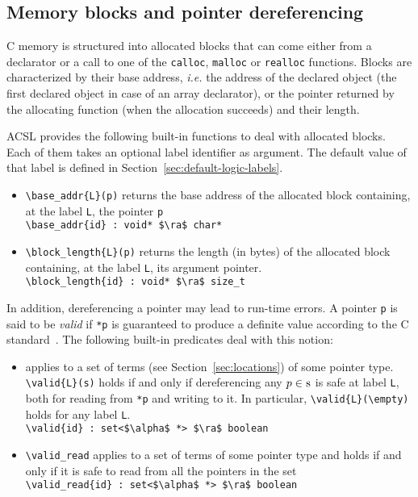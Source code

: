 \subsection{Memory blocks and pointer dereferencing}
\label{subsec:memory}
C memory is structured into allocated blocks that can come either from a 
declarator or a call to one of the \lstinline|calloc|, \lstinline|malloc| or
\lstinline|realloc| functions. Blocks are characterized by their base address, 
{\it i.e.} the address of the declared object (the first declared object 
in case of an array declarator), or the pointer returned by the allocating 
function (when the allocation succeeds) and their length.

ACSL provides the following built-in functions to deal with allocated blocks.
Each of them takes an optional label identifier as argument.
The default value of that label is defined in Section~\ref{sec:default-logic-labels}.
\begin{itemize}
\item \lstinline|\base_addr{L}(p)|
returns the base address of the allocated block
containing, at the label \lstinline|L|, the pointer \lstinline|p|
\\ \makebox[5mm]{} \lstinline|\base_addr{id} : void* $\ra$ char*|

\item \lstinline|\block_length{L}(p)|
  returns the length (in bytes) of the allocated block containing, 
  at the label \lstinline|L|, its argument pointer.
\\ \makebox[5mm]{} \lstinline|\block_length{id} : void* $\ra$ size_t|

\end{itemize}

In addition, dereferencing a pointer may lead to run-time errors. A pointer
\lstinline|p| is said to be \emph{valid} if \lstinline|*p| is guaranteed to
produce a definite value according to the C standard~\cite{standardc99}. The
following built-in predicates deal with this notion:
\begin{itemize}
\item \valid{} applies to a set of terms 
(see Section~\ref{sec:locations}) of some pointer type. 
\lstinline|\valid{L}(s)| holds if and only if
 dereferencing any $p\in \lstinline|s|$ is safe  at label \lstinline|L|, both for reading from 
\lstinline|*p| and writing to it. In particular,
\lstinline|\valid{L}(\empty)| holds for any label \lstinline|L|. 
\\ \makebox[5mm]{} \lstinline|\valid{id} : set<$\alpha$ *> $\ra$ boolean|
\item 
\lstinline|\valid_read|
applies to a set of terms of some pointer type and holds if and only
if it is safe to read from all the pointers in the set
\\ \makebox[5mm]{} \lstinline|\valid_read{id} : set<$\alpha$ *> $\ra$ boolean|
\end{itemize}

